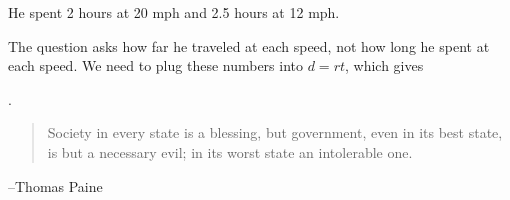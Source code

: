 \documentclass[letterpaper]{exam}
\begin{document}
\begin{description}
      He spent 2 hours at 20 mph and 2.5 hours at 12 mph.  

      The question asks how far he traveled at each speed, not how long he spent at each speed.  We need to plug these
      numbers into $d = rt$, which gives 
      
      .  

  \end{description}
  \fi

  \ifprintanswers{}
  \else
    \vspace{8 cm}
    \begin{quote}
      \begin{em}
        Society in every state is a blessing, but government, even in its best state, is but a
        necessary evil; in its worst state an intolerable one. 
      \end{em}
    \end{quote}
    \hspace{1 cm} --Thomas Paine
  \fi
\end{document}
